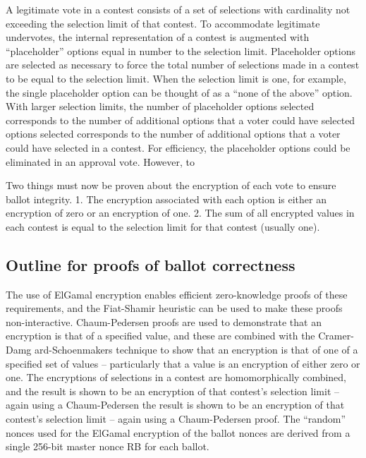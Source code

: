 A legitimate vote in a contest consists of a set of selections with cardinality not exceeding the selection limit of
that contest. To accommodate legitimate undervotes, the internal representation of a contest is augmented with
“placeholder” options equal in number to the selection limit. Placeholder options are selected as necessary to force the
total number of selections made in a contest to be equal to the selection limit. When the selection limit is one, for
example, the single placeholder option can be thought of as a “none of the above” option. With larger selection limits,
the number of placeholder options selected corresponds to the number of additional options that a voter could have
selected
\cite[12]{eg-spec}
options selected corresponds to the number of additional options that a voter could have selected in a contest. For
efficiency, the placeholder options could be eliminated in an approval vote. However, to
\cite[12]{eg-spec}

Two things must now be proven about the encryption of each vote to ensure ballot integrity. 1. The encryption associated
with each option is either an encryption of zero or an encryption of one. 2. The sum of all encrypted values in each
contest is equal to the selection limit for that contest (usually one).
\cite[12]{eg-spec}

\subsection{Outline for proofs of ballot correctness}

The use of ElGamal encryption enables efficient zero-knowledge proofs of these requirements, and the Fiat-Shamir
heuristic can be used to make these proofs non-interactive. Chaum-Pedersen proofs are used to demonstrate that an
encryption is that of a specified value, and these are combined with the Cramer-Damg ard-Schoenmakers technique to show
that an encryption is that of one of a specified set of values – particularly that a value is an encryption of either
zero or one. The encryptions of selections in a contest are homomorphically combined, and the result is shown to be an
encryption of that contest’s selection limit – again using a Chaum-Pedersen
\cite[13]{eg-spec}
the result is shown to be an encryption of that contest’s selection limit – again using a Chaum-Pedersen proof.
\cite[13]{eg-spec}
The “random” nonces used for the ElGamal encryption of the ballot nonces are derived from a single 256-bit master nonce
RB for each ballot.
\cite[13]{eg-spec}

